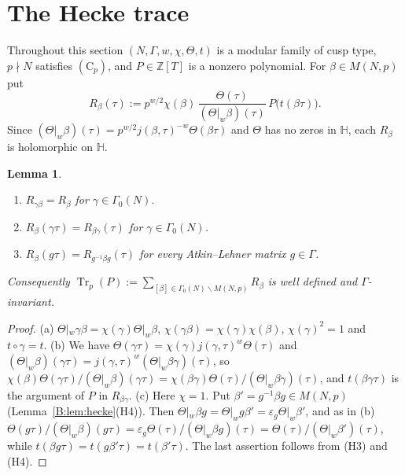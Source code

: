 \documentclass[11pt,a4paper]{article}
\newtheorem{lemma}[theorem]{Lemma}
\theoremstyle{definition}\newtheorem{definition}[theorem]{Definition}
\theoremstyle{remark}\newtheorem{remark}[theorem]{Remark}
\newcommand{\Z}{\mathbb Z}
\newcommand{\Hb}{\mathbb H}
\DeclareMathOperator{\Tr}{Tr}
\numberwithin{equation}{section}
\begin{document}
\section{The Hecke trace}\label{B:source-main-3}\label{B:sec:trace}
Throughout this section $(N,\Gamma,w,\chi,\Theta,t)$ is a modular family of cusp type, $p\nmid N$
satisfies $(\mathrm C_p)$, and $P\in\Z[T]$ is a nonzero polynomial. For $\beta\in M(N,p)$ put
\[
R_\beta(\tau):=p^{w/2}\chi(\beta)\,\frac{\Theta(\tau)}{(\Theta|_w\beta)(\tau)}\,P\bigl(t(\beta\tau)\bigr).
\]
Since $(\Theta|_w\beta)(\tau)=p^{w/2}j(\beta,\tau)^{-w}\Theta(\beta\tau)$ and $\Theta$ has no zeros in
$\Hb$, each $R_\beta$ is holomorphic on $\Hb$.

\begin{lemma}\label{B:lem:perm}
\begin{enumerate}[label=\textup{(\alph*)}]
\item $R_{\gamma\beta}=R_\beta$ for $\gamma\in\Gamma_0(N)$.
\item $R_\beta(\gamma\tau)=R_{\beta\gamma}(\tau)$ for $\gamma\in\Gamma_0(N)$.
\item $R_\beta(g\tau)=R_{g^{-1}\beta g}(\tau)$ for every Atkin--Lehner matrix $g\in\Gamma$.
\end{enumerate}
Consequently $\Tr_p(P):=\sum_{[\beta]\in\Gamma_0(N)\backslash M(N,p)}R_\beta$ is well defined and
$\Gamma$-invariant.
\end{lemma}
\begin{proof}
(a) $\Theta|_w\gamma\beta=\chi(\gamma)\Theta|_w\beta$, $\chi(\gamma\beta)=\chi(\gamma)\chi(\beta)$,
$\chi(\gamma)^2=1$ and $t\circ\gamma=t$. (b) We have
$\Theta(\gamma\tau)=\chi(\gamma)j(\gamma,\tau)^w\Theta(\tau)$ and
$(\Theta|_w\beta)(\gamma\tau)=j(\gamma,\tau)^w(\Theta|_w\beta\gamma)(\tau)$, so
$\chi(\beta)\Theta(\gamma\tau)/(\Theta|_w\beta)(\gamma\tau)=\chi(\beta\gamma)\Theta(\tau)/(\Theta|_w\beta\gamma)(\tau)$,
and $t(\beta\gamma\tau)$ is the argument of $P$ in $R_{\beta\gamma}$. (c) Here $\chi=1$. Put
$\beta'=g^{-1}\beta g\in M(N,p)$ (Lemma~\ref{B:lem:hecke}(H4)). Then
$\Theta|_w\beta g=\Theta|_wg\beta'=\varepsilon_g\Theta|_w\beta'$, and as in (b)
$\Theta(g\tau)/(\Theta|_w\beta)(g\tau)=\varepsilon_g\Theta(\tau)/(\Theta|_w\beta g)(\tau)
=\Theta(\tau)/(\Theta|_w\beta')(\tau)$, while $t(\beta g\tau)=t(g\beta'\tau)=t(\beta'\tau)$. The last
assertion follows from (H3) and (H4).
\end{proof}
\end{document}
